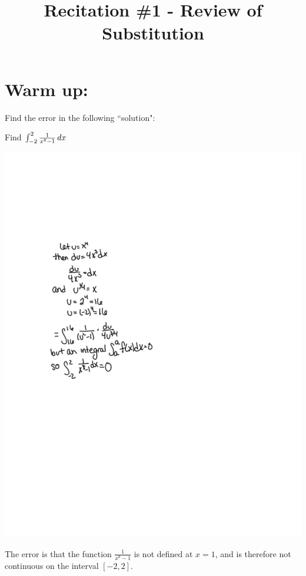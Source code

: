 \documentclass[handout,nooutcomes]{ximera}
\title{Recitation \#1 - Review of Substitution}
\begin{document}
\begin{abstract}		\end{abstract}
\maketitle



\section{Warm up:}
Find the error in the following ``solution":

Find $\int_{-2}^2 \frac{1}{x^8 - 1} \,d x$

	\begin{image}
	\includegraphics[trim= 120 320 350 180]{Figure1.pdf}
	\end{image}

	\begin{freeResponse}
	The error is that the function $\frac{1}{x^8-1}$ is not defined at $x=1$, and is therefore not continuous on the interval $[-2,2]$.
	\end{freeResponse}
\end{document}
